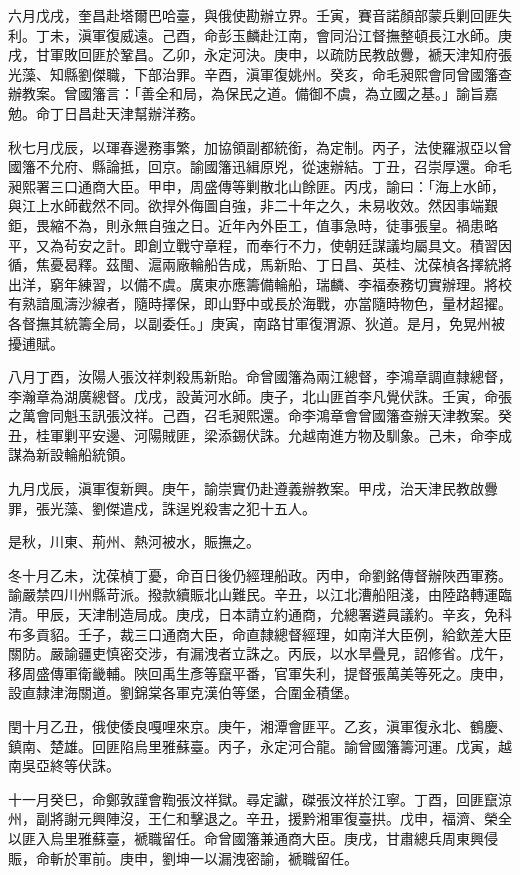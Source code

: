 \begin{pinyinscope}
六月戊戌，奎昌赴塔爾巴哈臺，與俄使勘辦立界。壬寅，賽音諾顏部蒙兵剿回匪失利。丁未，滇軍復威遠。己酉，命彭玉麟赴江南，會同沿江督撫整頓長江水師。庚戌，甘軍敗回匪於鞏昌。乙卯，永定河決。庚申，以疏防民教啟釁，褫天津知府張光藻、知縣劉傑職，下部治罪。辛酉，滇軍復姚州。癸亥，命毛昶熙會同曾國籓查辦教案。曾國籓言：「善全和局，為保民之道。備御不虞，為立國之基。」諭旨嘉勉。命丁日昌赴天津幫辦洋務。

秋七月戊辰，以琿春邊務事繁，加協領副都統銜，為定制。丙子，法使羅淑亞以曾國籓不允府、縣論抵，回京。諭國籓迅緝原兇，從速辦結。丁丑，召崇厚還。命毛昶熙署三口通商大臣。甲申，周盛傳等剿散北山餘匪。丙戌，諭曰：「海上水師，與江上水師截然不同。欲捍外侮圖自強，非二十年之久，未易收效。然因事端艱鉅，畏縮不為，則永無自強之日。近年內外臣工，值事急時，徒事張皇。禍患略平，又為茍安之計。即創立戰守章程，而奉行不力，使朝廷謀議均屬具文。積習因循，焦憂曷釋。茲閩、滬兩廠輪船告成，馬新貽、丁日昌、英桂、沈葆楨各擇統將出洋，窮年練習，以備不虞。廣東亦應籌備輪船，瑞麟、李福泰務切實辦理。將校有熟諳風濤沙線者，隨時擇保，即山野中或長於海戰，亦當隨時物色，量材超擢。各督撫其統籌全局，以副委任。」庚寅，南路甘軍復渭源、狄道。是月，免晃州被擾逋賦。

八月丁酉，汝陽人張汶祥刺殺馬新貽。命曾國籓為兩江總督，李鴻章調直隸總督，李瀚章為湖廣總督。戊戌，設黃河水師。庚子，北山匪首李凡覺伏誅。壬寅，命張之萬會同魁玉訊張汶祥。己酉，召毛昶熙還。命李鴻章會曾國籓查辦天津教案。癸丑，桂軍剿平安邊、河陽賊匪，梁添錫伏誅。允越南進方物及馴象。己未，命李成謀為新設輪船統領。

九月戊辰，滇軍復新興。庚午，諭崇實仍赴遵義辦教案。甲戌，治天津民教啟釁罪，張光藻、劉傑遣戍，誅逞兇殺害之犯十五人。

是秋，川東、荊州、熱河被水，賑撫之。

冬十月乙未，沈葆楨丁憂，命百日後仍經理船政。丙申，命劉銘傳督辦陜西軍務。諭嚴禁四川州縣苛派。撥款續賑北山難民。辛丑，以江北漕船阻淺，由陸路轉運臨清。甲辰，天津制造局成。庚戌，日本請立約通商，允總署遴員議約。辛亥，免科布多貢貂。壬子，裁三口通商大臣，命直隸總督經理，如南洋大臣例，給欽差大臣關防。嚴諭疆吏慎密交涉，有漏洩者立誅之。丙辰，以水旱疊見，詔修省。戊午，移周盛傳軍衛畿輔。陜回禹生彥等竄平番，官軍失利，提督張萬美等死之。庚申，設直隸津海關道。劉錦棠各軍克漢伯等堡，合圍金積堡。

閏十月乙丑，俄使倭良嘎哩來京。庚午，湘潭會匪平。乙亥，滇軍復永北、鶴慶、鎮南、楚雄。回匪陷烏里雅蘇臺。丙子，永定河合龍。諭曾國籓籌河運。戊寅，越南吳亞終等伏誅。

十一月癸巳，命鄭敦謹會鞫張汶祥獄。尋定讞，磔張汶祥於江寧。丁酉，回匪竄涼州，副將謝元興陣沒，王仁和擊退之。辛丑，援黔湘軍復臺拱。戊申，福濟、榮全以匪入烏里雅蘇臺，褫職留任。命曾國籓兼通商大臣。庚戌，甘肅總兵周東興侵賑，命斬於軍前。庚申，劉坤一以漏洩密諭，褫職留任。


\end{pinyinscope}
